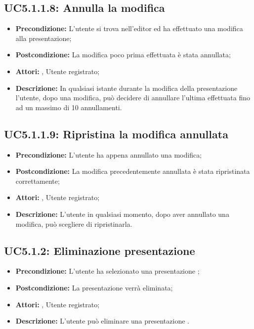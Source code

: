 \subsection{ UC5.1.1.8: Annulla la modifica}

\begin{itemize}
	\item \textbf{Precondizione:} L’utente si trova nell’editor ed ha effettuato una modifica alla presentazione;
	\item \textbf{Postcondizione:} La modifica poco prima effettuata è stata annullata;
	\item \textbf{Attori:} , Utente registrato;
	\item \textbf{Descrizione:} In qualsiasi istante durante la modifica della presentazione l’utente, dopo una modifica, può decidere di annullare l’ultima effettuata fino ad un massimo di 10 annullamenti.
\end{itemize}
\subsection{ UC5.1.1.9: Ripristina la modifica annullata}

\begin{itemize}
	\item \textbf{Precondizione:} L’utente ha appena annullato una modifica;
	\item \textbf{Postcondizione:} La modifica precedentemente annullata è stata ripristinata correttamente;
	\item \textbf{Attori:} , Utente registrato;
	\item \textbf{Descrizione:} L’utente in qualsiasi momento, dopo aver annullato una modifica, può scegliere di ripristinarla.
\end{itemize}
\subsection{ UC5.1.2: Eliminazione presentazione}

\begin{itemize}
	\item \textbf{Precondizione:} L'utente ha selezionato una presentazione ;
	\item \textbf{Postcondizione:} La presentazione verrà eliminata;
	\item \textbf{Attori:} , Utente registrato;
	\item \textbf{Descrizione:} L'utente può eliminare una presentazione .
\end{itemize}
